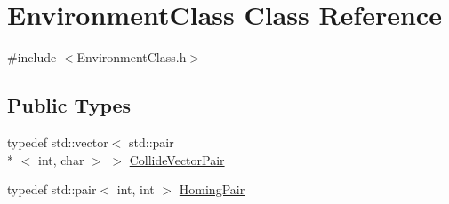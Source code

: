 \hypertarget{classEnvironment}{\section{Environment\-Class Class Reference}
\label{classEnvironment}
}


{\ttfamily \#include $<$Environment\-Class.\-h$>$}

\subsection*{Public Types}
\begin{DoxyCompactItemize}
\item 
typedef std\-::vector$<$ std\-::pair\\*
$<$ int, char $>$ $>$ \hyperlink{classEnvironment_a76889d11a26328e6a105679db7cebf14}{Collide\-Vector\-Pair}
\item 
typedef std\-::pair$<$ int, int $>$ \hyperlink{classEnvironment_a2f5699350dc2d65fd4dc6974e03a7cf5}{Homing\-Pair}
\end{DoxyCompactItemize}

